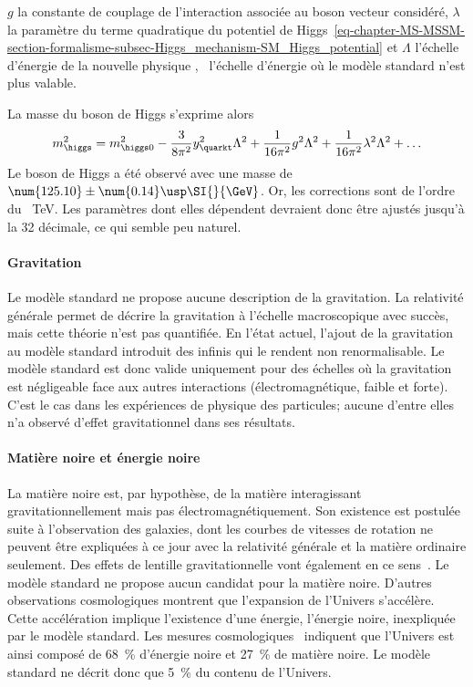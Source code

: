 $g$ la constante de couplage de l'interaction associée au boson vecteur considéré,
$\lambda$ la paramètre du terme quadratique du potentiel de Higgs~\eqref{eq-chapter-MS-MSSM-section-formalisme-subsec-Higgs_mechanism-SM_Higgs_potential} et
$\Lambda$ l'échelle d'énergie de la \og nouvelle physique \fg, \ie\ l'échelle d'énergie où le modèle standard n'est plus valable.
\par La masse du boson de Higgs s'exprime alors
\begin{equation}
m_{\higgs}^2 = m_{\higgs 0}^2 -\frac{3}{8\pi^2} y_{\quarkt}^2 \Lambda^2  +\frac{1}{16\pi^2} g^2 \Lambda^2 + \frac{1}{16\pi^2} \lambda^2 \Lambda^2 + \ldots
\end{equation}
Le boson de Higgs a été observé avec une masse de $\num{125.10}\pm\num{0.14}\usp\SI{}{\GeV}$.
Or, les corrections sont de l'ordre du \SI{}{\TeV}.
Les paramètres dont elles dépendent devraient donc être ajustés jusqu'à la 32 décimale, ce qui semble peu naturel.
\paragraph{Gravitation}
Le modèle standard ne propose aucune description de la gravitation.
La relativité générale permet de décrire la gravitation à l'échelle macroscopique avec succès, mais cette théorie n'est pas quantifiée.
En l'état actuel, l'ajout de la gravitation au modèle standard introduit des infinis qui le rendent non renormalisable.
Le modèle standard est donc valide uniquement pour des échelles où la gravitation est négligeable face aux autres interactions (électromagnétique, faible et forte).
C'est le cas dans les expériences de physique des particules; aucune d'entre elles n'a observé d'effet gravitationnel dans ses résultats.
\paragraph{Matière noire et énergie noire}
La matière noire est, par hypothèse, de la matière interagissant gravitationnellement mais pas électromagnétiquement.
Son existence est postulée suite à l'observation des galaxies, dont les courbes de vitesses de rotation ne peuvent être expliquées à ce jour avec la relativité générale et la matière ordinaire seulement. Des effets de lentille gravitationnelle vont également en ce sens~\cite{Clowe_2006}.
Le modèle standard ne propose aucun candidat pour la matière noire.
D'autres observations cosmologiques montrent que l'expansion de l'Univers s'accélère. Cette accélération implique l'existence d'une énergie, l'énergie noire, inexpliquée par le modèle standard.
Les mesures cosmologiques~\cite{planck_2013} indiquent que l'Univers est ainsi composé de \SI{68}{\%} d'énergie noire et \SI{27}{\%} de matière noire. Le modèle standard ne décrit donc que \SI{5}{\%} du contenu de l'Univers.

